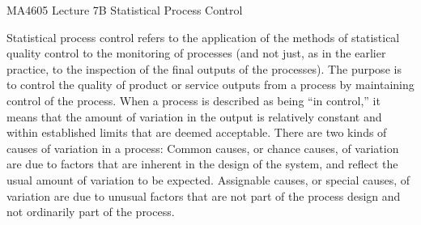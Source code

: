 MA4605 Lecture 7B 
Statistical Process Control 

Statistical process control refers to the application of the methods of statistical quality control to the monitoring of processes (and not just, as in the earlier practice, to the inspection of the final outputs of the processes). The purpose is to control the quality of product or service outputs from a process by maintaining control of the process. When a process is described as being “in control,” it means that the amount of variation in the output is relatively constant and within established limits that are deemed acceptable. There are two kinds of causes of variation in a process: Common causes, or chance causes, of variation are due to factors that are inherent in the design of the system, and reflect the usual amount of variation to be expected. Assignable causes, or special causes, of variation are due to unusual factors that are not part of the process design and not ordinarily part of the process. 

